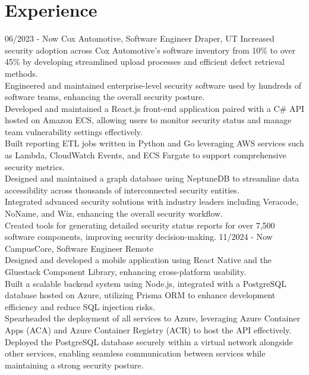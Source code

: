 \documentclass[]{friggeri-cv}
\begin{document}
\section{Experience}
\begin{entrylist}
	  \entry
	{06/2023 - Now}
	{Cox Automotive, Software Engineer}
	{Draper, UT}
	{ 
    Increased security adoption across Cox Automotive's software inventory from 10\% to over 45\% by developing streamlined upload processes and efficient defect retrieval methods.
    \\ Engineered and maintained enterprise-level security software used by hundreds of software teams, enhancing the overall security posture.
    \\ Developed and maintained a React.js front-end application paired with a C\# API hosted on Amazon ECS, allowing users to monitor security status and manage team vulnerability settings effectively.
    \\ Built reporting ETL jobs written in Python and Go leveraging AWS services such as Lambda, CloudWatch Events, and ECS Fargate to support comprehensive security metrics.
    \\ Designed and maintained a graph database using NeptuneDB to streamline data accessibility across thousands of interconnected security entities.
    \\ Integrated advanced security solutions with industry leaders including Veracode, NoName, and Wiz, enhancing the overall security workflow.
    \\ Created tools for generating detailed security status reports for over 7,500 software components, improving security decision-making.
  }
  \entry
    {11/2024 - Now}
    {CampusCore, Software Engineer}
    {Remote}
    {
    \\Designed and developed a mobile application using React Native and the Gluestack Component Library, enhancing cross-platform usability.
    \\Built a scalable backend system using Node.js, integrated with a PostgreSQL database hosted on Azure, utilizing Prisma ORM to enhance development efficiency and reduce SQL injection risks.
    \\Spearheaded the deployment of all services to Azure, leveraging Azure Container Apps (ACA) and Azure Container Registry (ACR) to host the API effectively.
    \\Deployed the PostgreSQL database securely within a virtual network alongside other services, enabling seamless communication between services while maintaining a strong security posture.
}
\end{entrylist}
\end{document}
